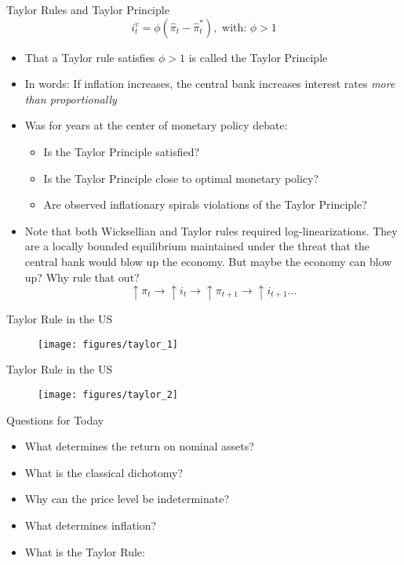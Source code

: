 \documentclass[11pt,aspectratio=169,xcolor={dvipsnames},hyperref={pdftex,pdfpagemode=UseNone,hidelinks,pdfdisplaydoctitle=true},usepdftitle=false]{beamer}
\begin{document}
\begin{frame}{Taylor Rules and Taylor Principle}
$$ i^v_t = \phi (\hat{\pi}_t - \hat{\pi}_t^*), \text{   with:  } \phi >1$$
\begin{itemize}
\item That a Taylor rule satisfies $\phi>1$ is called the Taylor Principle
\item In words: If inflation increases, the central bank increases interest rates \textit{more than proportionally}
\item Was for years at the center of monetary policy debate:
\begin{itemize}
\item Is the Taylor Principle satisfied?
\item Is the Taylor Principle close to optimal monetary policy?
\item Are observed inflationary spirals violations of the Taylor Principle?
\end{itemize}
\item Note that both Wicksellian and Taylor rules required log-linearizations. They are a locally bounded equilibrium maintained under the threat that the central bank would blow up the economy. But maybe the economy can blow up? Why rule that out?
$$\uparrow \pi_t \rightarrow \uparrow i_t \rightarrow \uparrow \pi_{t+1} \rightarrow \uparrow i_{t+1} ...$$
\end{itemize}
\end{frame}



\begin{frame}{Taylor Rule in the US}
\begin{figure}
\centering
\texttt{[image: figures/taylor\_1]}
\end{figure}
\end{frame}

\begin{frame}{Taylor Rule in the US}
\begin{figure}
\centering
\texttt{[image: figures/taylor\_2]}
\end{figure}
\end{frame}

\begin{frame}{Questions for Today}
\begin{itemize}
\item What determines the return on nominal assets? {\color{red}{The Fisher Equation. An arbitrage condition}}
\item What is the classical dichotomy? {\color{red}{Monetary policy is neutral. Theoretical starting point}}
\item Why can the price level be indeterminate? {\color{red}{Because units are a veil. No money illusion}}
\item What determines inflation? {\color{red}{So far arbitrage and the ability of the government to issue liabilities and set its price}}
\item What is the Taylor Rule: {\color{red}{Hike interest rates aggresively when inflation occurs. Pins down inflation locally. Potential problems with inflationary explosions and the ZLB.}}
\end{itemize}
\end{frame}
\end{document}
